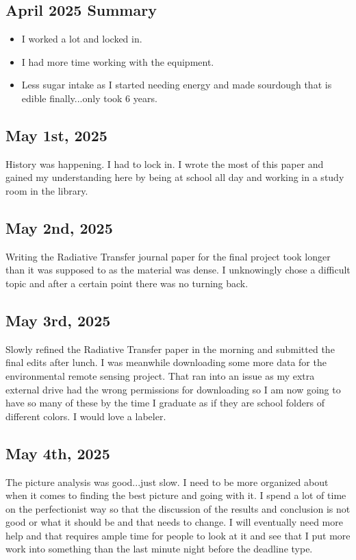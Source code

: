 \documentclass{article}
\begin{document}
\subsection{April 2025 Summary}

\begin{itemize}
    \item I worked a lot and locked in.
    \item I had more time working with the equipment. 
    \item Less sugar intake as I started needing energy and made sourdough that is edible finally...only took 6 years. 
\end{itemize}



\subsection{May 1st, 2025}
History was happening. I had to lock in. I wrote the most of this paper and gained my understanding here by being at school all day and working in a study room in the library.





\subsection{May 2nd, 2025}
Writing the Radiative Transfer journal paper for the final project took longer than it was supposed to as the material was dense. I unknowingly chose a difficult topic and after a certain point there was no turning back. 


\subsection{May 3rd, 2025}
Slowly refined the Radiative Transfer paper in the morning and submitted the final edits after lunch. I was meanwhile downloading some more data for the environmental remote sensing project. That ran into an issue as my extra external drive had the wrong permissions for downloading so I am now going to have so many of these by the time I graduate as if they are school folders of different colors. I would love a labeler. 


\subsection{May 4th, 2025}
The picture analysis was good...just slow. I need to be more organized about when it comes to finding the best picture and going with it. I spend a lot of time on the perfectionist way so that the discussion of the results and conclusion is not good or what it should be and that needs to change. I will eventually need more help and that requires ample time for people to look at it and see that I put more work into something than the last minute night before the deadline type. 
\end{document}

